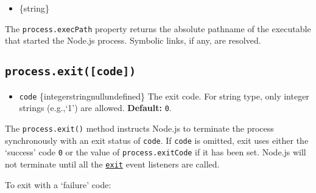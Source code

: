 \begin{itemize}
\tightlist
\item
  \{string\}
\end{itemize}

The \texttt{process.execPath} property returns the absolute pathname of
the executable that started the Node.js process. Symbolic links, if any,
are resolved.

\begin{Shaded}
\begin{Highlighting}[]
\end{Highlighting}
\end{Shaded}

\subsection{\texorpdfstring{\texttt{process.exit({[}code{]})}}{process.exit({[}code{]})}}\label{process.exitcode}

\begin{itemize}
\tightlist
\item
  \texttt{code}
  \{integer\textbar string\textbar null\textbar undefined\} The exit
  code. For string type, only integer strings (e.g.,`1') are allowed.
  \textbf{Default:} \texttt{0}.
\end{itemize}

The \texttt{process.exit()} method instructs Node.js to terminate the
process synchronously with an exit status of \texttt{code}. If
\texttt{code} is omitted, exit uses either the `success' code \texttt{0}
or the value of \texttt{process.exitCode} if it has been set. Node.js
will not terminate until all the
\hyperref[event-exit]{\texttt{\textquotesingle{}exit\textquotesingle{}}}
event listeners are called.

To exit with a `failure' code:

\begin{Shaded}
\begin{Highlighting}[]
 \OperatorTok{;}

\NormalTok{(}\NormalTok{)}\OperatorTok{;}
\end{Highlighting}
\end{Shaded}

\begin{Shaded}
\begin{Highlighting}[]
\OperatorTok{=} \NormalTok{(}\NormalTok{)}\OperatorTok{;}

\NormalTok{(}\NormalTok{)}\OperatorTok{;}
\end{Highlighting}
\end{Shaded}

